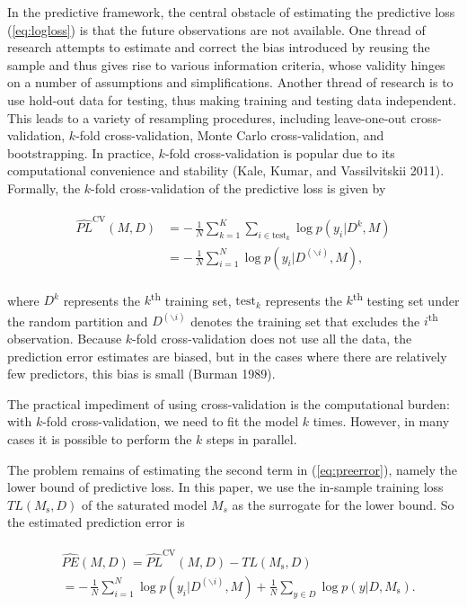 \documentclass[11pt,article,oneside]{memoir}
\begin{document}
In the predictive framework, the central obstacle of estimating the
predictive loss (\ref{eq:logloss}) is that the future observations are
not available. One thread of research attempts to estimate and correct
the bias introduced by reusing the sample and thus gives rise to various
information criteria, whose validity hinges on a number of assumptions
and simplifications. Another thread of research is to use hold-out data
for testing, thus making training and testing data independent. This
leads to a variety of resampling procedures, including leave-one-out
cross-validation, \(k\)-fold cross-validation, Monte Carlo
cross-validation, and bootstrapping. In practice, \(k\)-fold
cross-validation is popular due to its computational convenience and
stability (Kale, Kumar, and Vassilvitskii 2011). Formally, the
\(k\)-fold cross-validation of the predictive loss is given by

\begin{align}
\begin{split}
  \label{eq:xvalesti}
  \widehat{PL}^{\text{CV}}(M, D) &=-\,\frac{1}{N}\sum_{k=1}^K\sum_{i\in
    \text{test}_k}\log p(y_i|D^k, M)\\
  &=-\,\frac{1}{N}\sum_{i=1}^N\log
  p(y_i|D^{(\backslash i)}, M),
\end{split}
\end{align}

\noindent where \(D^k\) represents the \(k\)\textsuperscript{th}
training set, \(\text{test}_k\) represents the \(k\)\textsuperscript{th}
testing set under the random partition and \(D^{(\backslash i)}\)
denotes the training set that excludes the \(i\)\textsuperscript{th}
observation. Because \(k\)-fold cross-validation does not use all the
data, the prediction error estimates are biased, but in the cases where
there are relatively few predictors, this bias is small (Burman 1989).

The practical impediment of using cross-validation is the computational
burden: with \(k\)-fold cross-validation, we need to fit the model \(k\)
times. However, in many cases it is possible to perform the \(k\) steps
in parallel.

The problem remains of estimating the second term in
(\ref{eq:preerror}), namely the lower bound of predictive loss. In this
paper, we use the in-sample training loss \(TL(M_{\text{s}}, D)\) of the
saturated model \(M_s\) as the surrogate for the lower bound. So the
estimated prediction error is

\begin{align}
\begin{split}
  \label{eq:esti_preerror}
  &\widehat{PE}(M, D)=\widehat{PL}^{\text{CV}}(M,D)-TL(M_{\text{s}},D)\\
  &= -\,\frac{1}{N}\sum_{i=1}^N\log p(y_i|D^{(\backslash i)},
  M)+\frac{1}{N}\sum_{y\in D}\log p(y | D, M_{\text{s}}).
\end{split}
\end{align}
\end{document}
